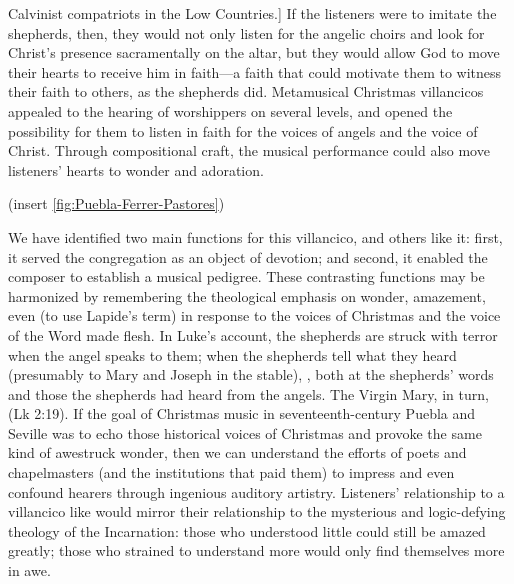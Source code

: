 Calvinist compatriots in the Low Countries.]
If the listeners were to imitate the shepherds, then, they would not only listen
for the angelic choirs and look for Christ's presence sacramentally on the
altar, but they would allow God to move their hearts to receive him in
faith---a faith that could motivate them to witness their faith to others, as
the shepherds did.
Metamusical Christmas villancicos appealed to the hearing of worshippers on
several levels, and opened the possibility for them to listen in faith for the
voices of angels and the voice of Christ.
Through compositional craft, the musical performance could also move listeners'
hearts to wonder and adoration.

(insert \cref{fig:Puebla-Ferrer-Pastores})
\label{fig:Puebla-Ferrer-Pastores}

We have identified two main functions for this villancico, and others like it:
first, it served the congregation as an object of devotion; and second, it
enabled the composer to establish a musical pedigree.
These contrasting functions may be harmonized by remembering the theological
emphasis on wonder, amazement, even  (to use Lapide's term) in
response to the voices of Christmas and the voice of the Word made
flesh.
In Luke's account, the shepherds are struck with terror when the angel speaks to
them; when the shepherds tell what they heard (presumably to Mary and Joseph
in the stable), , both at the shepherds' words and
those the shepherds had heard from the angels.
The Virgin Mary, in turn,  (Lk 2:19).
If the goal of Christmas music in seventeenth-century Puebla and Seville was to
echo those historical voices of Christmas and provoke the same kind of awestruck
wonder, then we can understand the efforts of poets and chapelmasters (and the
institutions that paid them) to impress and even confound hearers through
ingenious auditory artistry.
Listeners' relationship to a villancico like  would
mirror their relationship to the mysterious and logic-defying theology of the
Incarnation: those who understood little could still be amazed greatly; those
who strained to understand more would only find themselves more in awe.

